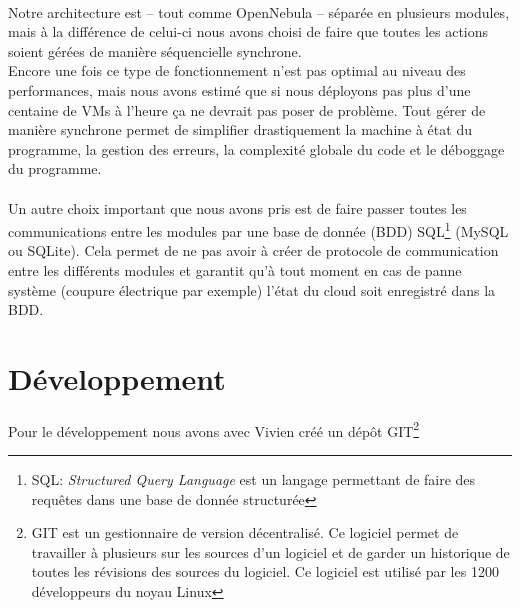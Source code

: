 \paragraph*{}
Notre architecture est -- tout comme OpenNebula -- séparée en plusieurs modules, mais à la différence de celui-ci nous avons choisi de faire que toutes les actions soient gérées
de manière séquencielle synchrone.\\ %
Encore une fois ce type de fonctionnement n'est pas optimal au niveau des performances, mais nous avons estimé que si nous déployons pas plus d'une centaine de VMs à
l'heure ça ne devrait pas poser de problème.
Tout gérer de manière synchrone permet de simplifier drastiquement la machine à état du programme, la gestion des erreurs, la complexité globale du code et le déboggage
du programme.

\paragraph*{}
Un autre choix important que nous avons pris est de faire passer toutes les communications entre les modules par une base de donnée (BDD)
SQL\footnote{SQL: \emph{Structured Query Language} est un langage permettant de faire des requêtes dans une base de donnée structurée} (MySQL ou SQLite).
Cela permet de ne pas avoir à créer de protocole de communication entre les différents modules et garantit qu'à tout moment en cas de panne système (coupure électrique
par exemple) l'état du cloud soit enregistré dans la BDD.

\section{Développement}

\paragraph*{}
Pour le développement nous avons avec Vivien créé un dépôt GIT\footnote{GIT est un gestionnaire de version décentralisé. Ce logiciel permet de travailler à plusieurs
sur les sources d'un logiciel et de garder un historique de toutes les révisions des sources du logiciel. Ce logiciel est utilisé par les 1200 développeurs du noyau Linux}

